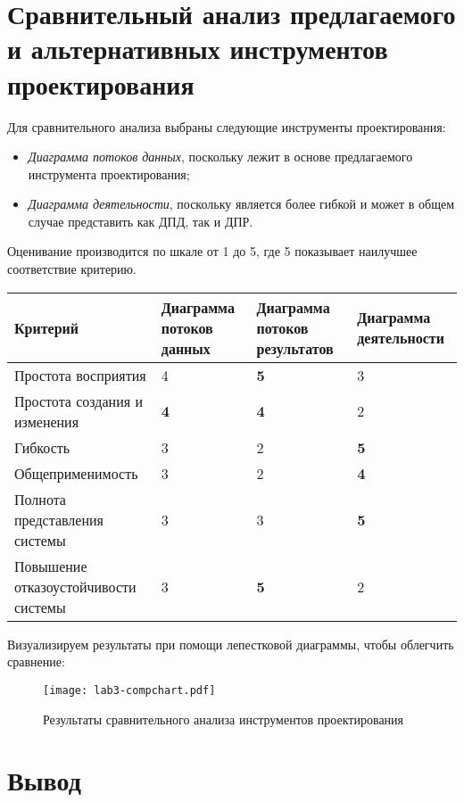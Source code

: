 \documentclass[listings]{labreport}
\begin{document}
\section*{Сравнительный анализ предлагаемого и альтернативных инструментов проектирования}

Для сравнительного анализа выбраны следующие инструменты проектирования:
\begin{itemize}[noitemsep,topsep=0em]
\item \textit{Диаграмма потоков данных}, поскольку лежит в основе предлагаемого инструмента проектирования;
\item \textit{Диаграмма деятельности}, поскольку является более гибкой и может в общем случае представить
  как ДПД, так и ДПР.
\end{itemize}

Оценивание производится по шкале от 1 до 5, где 5 показывает наилучшее соответствие критерию.

\begin{tabular}{L{5.5cm} L{3cm} L{3cm} L{3cm}}
  \toprule
  Критерий & Диаграмма потоков данных & Диаграмма потоков результатов & Диаграмма деятельности \\\hline
  Простота восприятия & 4 & \textbf{5} & 3 \\\hline
  Простота создания и изменения & \textbf{4} & \textbf{4} & 2 \\\hline
  Гибкость & 3 & 2 & \textbf{5} \\\hline
  Общеприменимость & 3 & 2 & \textbf{4} \\\hline
  Полнота представления системы & 3 & 3 & \textbf{5} \\\hline
  Повышение отказоустойчивости системы & 3 & \textbf{5} & 2 \\
  \bottomrule
\end{tabular}

\vspace{1em}

Визуализируем результаты при помощи лепестковой диаграммы, чтобы облегчить сравнение:

\begin{figure}[H]
\centering
\texttt{[image: lab3-compchart.pdf]}
\caption{\small{Результаты сравнительного анализа инструментов проектирования}}
\label{fig:compchart}
\end{figure}

\section*{Вывод}
\end{document}

